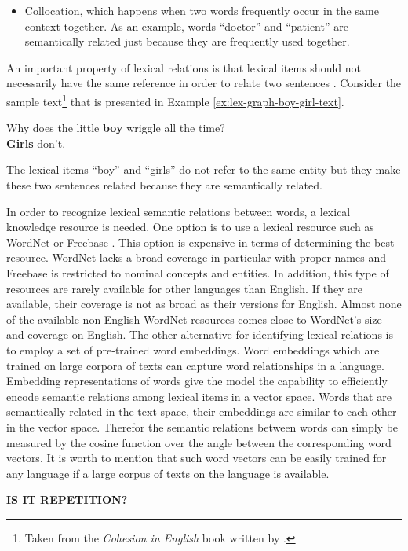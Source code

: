 {\begin{itemize}
\item Collocation, which happens when two words frequently occur in the same context together. As an example, words ``doctor'' and ``patient'' are semantically related just because they are frequently used together.

\end{itemize}

An important property of lexical relations is that lexical items should not necessarily have the same reference in order to relate two sentences \cite{halliday76}.
Consider the sample text\footnote{Taken from the \emph{Cohesion in English} book written by .} that is presented in Example \ref{ex:lex-graph-boy-girl-text}.

\begin{examples}
  \label{ex:lex-graph-boy-girl-text}
  Why does the little \textbf{boy} wriggle all the time? \\
  \textbf{Girls} don't.
\end{examples}

The lexical items ``boy'' and ``girls'' do not refer to the same entity but they make these two sentences related because they are semantically related.  

In order to recognize lexical semantic relations between words, a lexical knowledge resource is needed.   
One option is to use a lexical resource such as WordNet \cite{fellbaum98} or Freebase \cite{bollacker08}.  
This option is expensive in terms of determining the best resource.  
WordNet lacks a broad coverage in particular with proper names and Freebase is restricted to nominal concepts and entities. 
In addition, this type of resources are rarely available for other languages than English.
If they are available, their coverage is not as broad as their versions for English. 
Almost none of the available non-English WordNet resources comes close to WordNet's size and coverage on English. 
The other alternative for identifying lexical relations is to employ a set of pre-trained word embeddings. 
Word embeddings which are trained on large corpora of texts can capture word relationships in a language. 
Embedding representations of words give the model the capability to efficiently encode semantic relations among lexical items in a vector space. 
Words that are semantically related in the text space, their embeddings are similar to each other in the vector space. 
Therefor the semantic relations between words can simply be measured by the cosine function over the angle between the corresponding word vectors. 
It is worth to mention that such word vectors can be easily trained for any language if a large corpus of texts on the language is available.  
}\textbf{IS IT REPETITION?}
